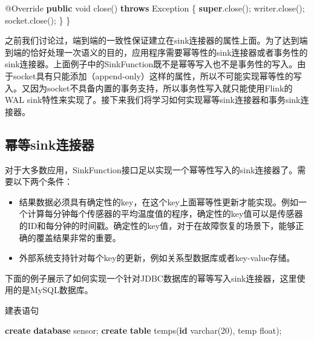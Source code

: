 \documentclass[cn,11pt,chinese]{elegantbook}
\newenvironment{Shaded}{}{}
\newcommand{\AttributeTok}[1]{\textcolor[rgb]{0.49,0.56,0.16}{#1}}
\newcommand{\BuiltInTok}[1]{#1}
\newcommand{\DataTypeTok}[1]{\textcolor[rgb]{0.56,0.13,0.00}{#1}}
\newcommand{\DecValTok}[1]{\textcolor[rgb]{0.25,0.63,0.44}{#1}}
\newcommand{\FunctionTok}[1]{\textcolor[rgb]{0.02,0.16,0.49}{#1}}
\newcommand{\KeywordTok}[1]{\textcolor[rgb]{0.00,0.44,0.13}{\textbf{#1}}}
\newcommand{\NormalTok}[1]{#1}
\providecommand{\tightlist}{%
  \setlength{\itemsep}{0pt}\setlength{\parskip}{0pt}}
\begin{document}
\begin{Shaded}
\begin{Highlighting}[]
    \AttributeTok{@Override}
    \KeywordTok{public} \DataTypeTok{void} \FunctionTok{close}\NormalTok{() }\KeywordTok{throws} \BuiltInTok{Exception}\NormalTok{ \{}
        \KeywordTok{super}\NormalTok{.}\FunctionTok{close}\NormalTok{();}
\NormalTok{        writer.}\FunctionTok{close}\NormalTok{();}
\NormalTok{        socket.}\FunctionTok{close}\NormalTok{();}
\NormalTok{    \}}
\NormalTok{\}}
\end{Highlighting}
\end{Shaded}

之前我们讨论过，端到端的一致性保证建立在sink连接器的属性上面。为了达到端到端的恰好处理一次语义的目的，应用程序需要幂等性的sink连接器或者事务性的sink连接器。上面例子中的SinkFunction既不是幂等写入也不是事务性的写入。由于socket具有只能添加（append-only）这样的属性，所以不可能实现幂等性的写入。又因为socket不具备内置的事务支持，所以事务性写入就只能使用Flink的WAL
sink特性来实现了。接下来我们将学习如何实现幂等sink连接器和事务sink连接器。

\hypertarget{ux5e42ux7b49sinkux8fdeux63a5ux5668}{%
\subsection{幂等sink连接器}\label{ux5e42ux7b49sinkux8fdeux63a5ux5668}}

对于大多数应用，SinkFunction接口足以实现一个幂等性写入的sink连接器了。需要以下两个条件：

\begin{itemize}
\tightlist
\item
  结果数据必须具有确定性的key，在这个key上面幂等性更新才能实现。例如一个计算每分钟每个传感器的平均温度值的程序，确定性的key值可以是传感器的ID和每分钟的时间戳。确定性的key值，对于在故障恢复的场景下，能够正确的覆盖结果非常的重要。
\item
  外部系统支持针对每个key的更新，例如关系型数据库或者key-value存储。
\end{itemize}

下面的例子展示了如何实现一个针对JDBC数据库的幂等写入sink连接器，这里使用的是MySQL数据库。

建表语句

\begin{Shaded}
\begin{Highlighting}[]
\KeywordTok{create} \KeywordTok{database}\NormalTok{ sensor;}
\KeywordTok{create} \KeywordTok{table}\NormalTok{ temps(}\KeywordTok{id} \DataTypeTok{varchar}\NormalTok{(}\DecValTok{20}\NormalTok{), temp }\DataTypeTok{float}\NormalTok{);}
\end{Highlighting}
\end{Shaded}
\end{document}

